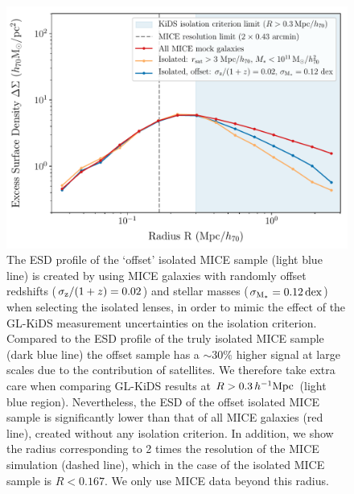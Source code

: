 \documentclass[usenatbib]{mnras}
\newcommand{\hMpc}{\, h^{-1}{\rm{Mpc}} }
\newcommand{\un}[1]{_{\rm #1}}
\newcommand{\dex}{\, {\rm dex}}
\begin{document}
\begin{figure}
	\includegraphics[width=1.0\columnwidth]{Figures/ESD_MICE_isotest_offset.pdf}
	\caption{The ESD profile of the `offset' isolated MICE sample (light blue line) is created by using MICE galaxies with randomly offset redshifts ($\sigma\un{z}/(1+z) = 0.02$) and stellar masses ($\sigma\un{M_*} = 0.12 \dex$) when selecting the isolated lenses, in order to mimic the effect of the GL-KiDS measurement uncertainties on the isolation criterion. Compared to the ESD profile of the truly isolated MICE sample (dark blue line) the offset sample has a $\sim30\%$ higher signal at large scales due to the contribution of satellites. We therefore take extra care when comparing GL-KiDS results at $R > 0.3 \hMpc$ (light blue region). Nevertheless, the ESD of the offset isolated MICE sample is significantly lower than that of all MICE galaxies (red line), created without any isolation criterion. In addition, we show the radius corresponding to 2 times the resolution of the MICE simulation (dashed line), which in the case of the isolated MICE sample is $R<0.167$. We only use MICE data beyond this radius.}
	\label{fig:isolation_test_offset}
\end{figure}
\end{document}
